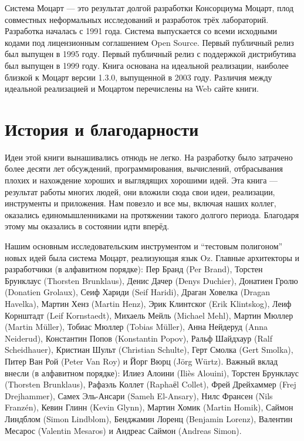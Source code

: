 Система Моцарт --- это результат долгой разработки Консорциума Моцарт, плод совместных неформальных исследований и разработок трёх лабораторий. Разработка началась с 1991 года. Система выпускается со всеми исходными кодами под лицензионным соглашением Open Source. Первый публичный релиз был выпущен в 1995 году. Первый публичный релиз с поддержкой дистрибутива был выпущен в 1999 году. Книга основана на идеальной реализации, наиболее близкой к Моцарт версии 1.3.0, выпущенной в 2003 году. Различия между идеальной реализацией и Моцартом перечислены на Web сайте книги.

\section*{История и благодарности}

Идеи этой книги вынашивались отнюдь не легко. На разработку было затрачено более десяти лет обсуждений, программирования, вычислений, отбрасывания плохих и нахождение хороших и выглядящих хорошими идей. Эта книга --- результат работы многих людей, они вложили сюда свои идеи, реализации, инструменты и приложения. Нам повезло и все мы, включая наших коллег, оказались единомышленниками на протяжении такого долгого периода. Благодаря этому мы оказались в состоянии идти вперёд.

Нашим основным исследовательским инструментом и ``тестовым полигоном'' новых идей была система Моцарт, реализующая язык Oz. Главные архитекторы и разработчики (в алфавитном порядке): Пер Бранд (Per Brand), Торстен Брунклаус (Thorsten Brunklaus), Денис Дачер (Denys Duchier), Донатиен Гролю (Donatien Grolaux), Сеиф Хариди (Seif Haridi), Драган Ховелка (Dragan Havelka), Мартин Хенз (Martin Henz), Эрик Клинтског (Erik Klintskog), Леиф Корнштадт (Leif Kornstaedt), Михаель Мейль (Michael Mehl), Мартин Мюллер (Martin Müller), Тобиас Мюллер (Tobias Müller), Анна Нейдеруд (Anna Neiderud), Константин Попов (Konstantin Popov), Ральф Шайдхаур (Ralf Scheidhauer), Кристиан Шульт (Christian Schulte), Герт Смолка (Gert Smolka), Питер Ван Рой (Peter Van Roy) и Йорг Вюрц (Jörg Würtz). Важный вклад внесли (в алфавитном порядке): Илиез Алоини (Iliès Alouini), Торстен Брунклаус (Thorsten Brunklaus), Рафаэль Коллет (Raphaёl Collet), Фрей Дрейхаммер (Frej Drejhammer), Самех Эль-Ансари (Sameh El-Ansary), Нилс Франсен (Nils Franz{\'e}n), Кевин Глинн (Kevin Glynn), Мартин Хомик (Martin Homik), Саймон Линдблом (Simon Lindblom), Бенджамин Лоренц (Benjamin Lorenz), Валентин Месарос (Valentin Mesaros) и Андреас Саймон (Andreas Simon).

